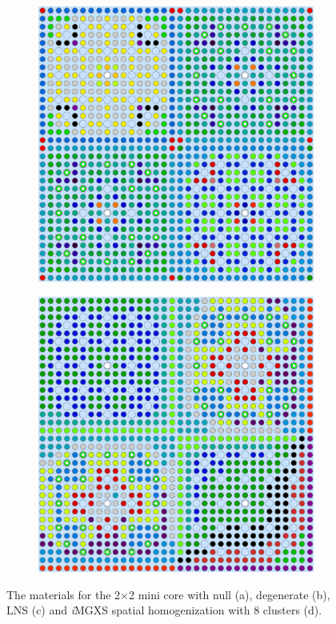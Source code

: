 \documentclass[12pt,twoside]{mitthesis-exec}
\begin{document}
\begin{figure}[h!]
\begin{subfigure}{0.47\textwidth}
  \includegraphics[width=0.75\linewidth]{figures/patterns/lns/reflector/materials}
  \caption{}
  \label{fig:reflector-lns}
\end{subfigure}%
\begin{subfigure}{0.47\textwidth}
  \centering
  \includegraphics[width=0.75\linewidth]{figures/unsupervised/geometries/with-features/8-clusters/combined/reflector}
  \caption{}
  \label{fig:reflector-8-clusters}
\end{subfigure}
\caption[Materials for the 2$\times$2 mini core]{The materials for the 2$\times$2 mini core with null (a), degenerate (b), LNS (c) and \textit{i}MGXS spatial homogenization with 8 clusters (d).}
\label{fig:colorset-geometries}
\end{figure}
\end{document}
